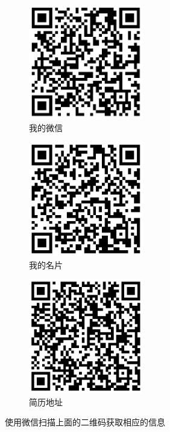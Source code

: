 \graphicspath{ {../} }

\begin{figure}[h]
  \begin{subfigure}{0.33\textwidth}\centering
    \includegraphics[width=0.9\linewidth, height=5cm]{weixin} 
    \caption{我的微信}
    \label{fig:subim1}
  \end{subfigure}
  \begin{subfigure}{0.33\textwidth}\centering
    \includegraphics[width=0.9\linewidth, height=5cm]{vcard}
    \caption{我的名片}
    \label{fig:subim2}
  \end{subfigure}
  \begin{subfigure}{0.33\textwidth}\centering
    \includegraphics[width=0.9\linewidth, height=5cm]{resume-url}
    \caption{简历地址}
    \label{fig:subim3}
  \end{subfigure}
  
  \caption{使用微信扫描上面的二维码获取相应的信息}
  \label{fig:image1}
\end{figure}